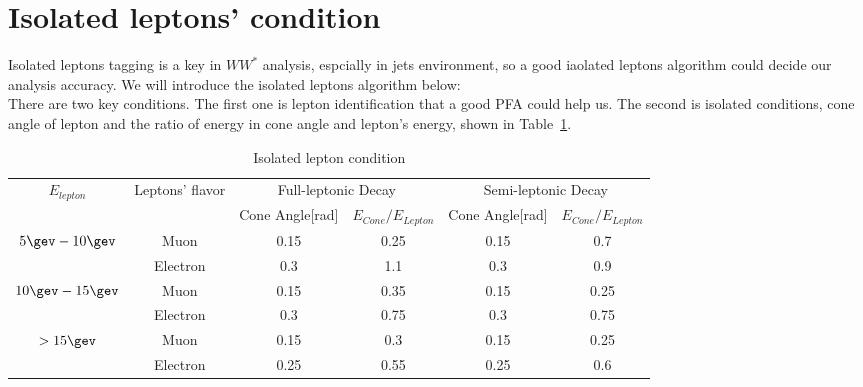 \documentclass[11pt,a4paper]{cepcnote}
\begin{document}
\section{Isolated leptons' condition}
\label{app:isolepcondition}
Isolated leptons tagging is a key in $WW^*$ analysis, espcially in jets environment, so a good iaolated leptons algorithm
could decide our analysis accuracy. We will introduce the isolated leptons algorithm below:\\
There are two key conditions. The first one is lepton identification that a good PFA could help us.
The second is isolated conditions, cone angle of lepton and the ratio of energy in cone angle and lepton's energy, 
shown in Table~\ref{tab:isolep}.
\begin{table}[H]
\begin{center}
\begin{tabular}{cccccc}
\hline \hline
\multirow{2}{*}{$E_{lepton}$} & \multirow{2}{*}{Leptons' flavor} 	& \multicolumn{2}{c}{Full-leptonic Decay} 
& \multicolumn{2}{c}{Semi-leptonic Decay}\\
							&									&Cone Angle[rad]&$E_{Cone}/E_{Lepton}$
							&Cone Angle[rad]&$E_{Cone}/E_{Lepton}$\\
\hline
\multirow{2}{*}{$5\gev-10\gev$}	&			Muon					&0.15		&0.25		&0.15		&0.7	\\
							&			Electron				&0.3		&1.1		&0.3		&0.9	\\
\hline
\multirow{2}{*}{$10\gev-15\gev$}	&			Muon					&0.15		&0.35		&0.15		&0.25	\\
							&			Electron				&0.3		&0.75		&0.3		&0.75	\\
\hline
\multirow{2}{*}{$>15\gev$}	&			Muon					&0.15		&0.3		&0.15		&0.25	\\
							&			Electron				&0.25		&0.55		&0.25		&0.6	\\
\hline \hline
\end{tabular}
\caption{Isolated lepton condition}
\label{tab:isolep}
\end{center}
\end{table}
%
\end{document}
